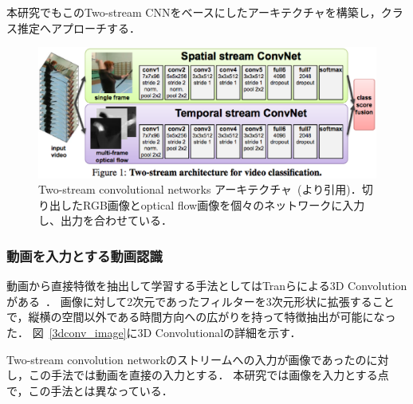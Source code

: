 本研究でもこのTwo-stream CNNをベースにしたアーキテクチャを構築し，クラス推定へアプローチする．
\begin{figure}[htbp]
 \begin{center}
  \includegraphics[width=12cm]{./Figures/two-stream.eps}
  \caption{Two-stream convolutional networks アーキテクチャ~(\cite{simonyan2014two}より引用)．切り出したRGB画像とoptical flow画像を個々のネットワークに入力し、出力を合わせている．}
  \label{2st_network}
 \end{center}
\end{figure}

\subsubsection{動画を入力とする動画認識}
動画から直接特徴を抽出して学習する手法としてはTranらによる3D Convolution がある~\cite{tran14}．
画像に対して2次元であったフィルターを3次元形状に拡張することで，縦横の空間以外である時間方向への広がりを持って特徴抽出が可能になった．
図~\ref{3dconv_image}に3D Convolutionalの詳細を示す．

Two-stream convolution networkのストリームへの入力が画像であったのに対し，この手法では動画を直接の入力とする．
本研究では画像を入力とする点で，この手法とは異なっている．

